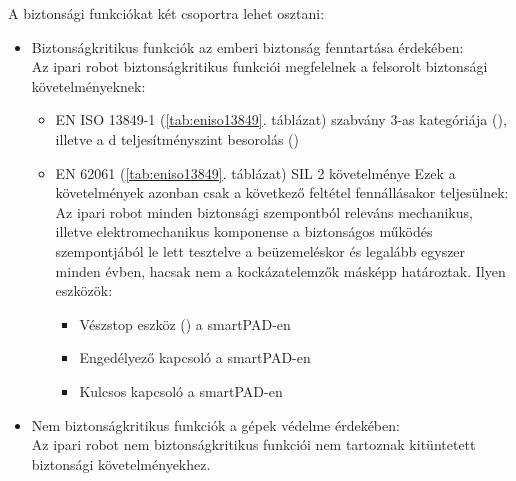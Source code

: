\documentclass[../documentation.tex]{subfiles}
\begin{document}
A biztonsági funkciókat két csoportra lehet osztani:
\begin{itemize}
	\item Biztonságkritikus funkciók az emberi biztonság fenntartása érdekében:\\
	Az ipari robot biztonságkritikus funkciói megfelelnek a felsorolt biztonsági követelményeknek:
	\begin{itemize}
		\item EN ISO 13849-1 (\ref{tab:eniso13849}. táblázat) szabvány 3-as kategóriája (), illetve a d teljesítményszint besorolás ()
		\item EN 62061 (\ref{tab:eniso13849}. táblázat) SIL 2 követelménye
		Ezek a követelmények azonban csak a következő feltétel fennállásakor teljesülnek:\\
		Az ipari robot minden biztonsági szempontból releváns mechanikus, illetve elektromechanikus komponense a biztonságos működés szempontjából le lett tesztelve a beüzemeléskor és legalább egyszer minden évben, hacsak nem a kockázatelemzők másképp határoztak. Ilyen eszközök:
		\begin{itemize}
			\item Vészstop eszköz () a smartPAD-en
			\item Engedélyező kapcsoló a smartPAD-en
			\item Kulcsos kapcsoló a smartPAD-en
		\end{itemize}
	\end{itemize}
	\item Nem biztonságkritikus funkciók a gépek védelme érdekében:\\
	Az ipari robot nem biztonságkritikus funkciói nem tartoznak kitüntetett biztonsági követelményekhez.
\end{itemize}
\end{document}
